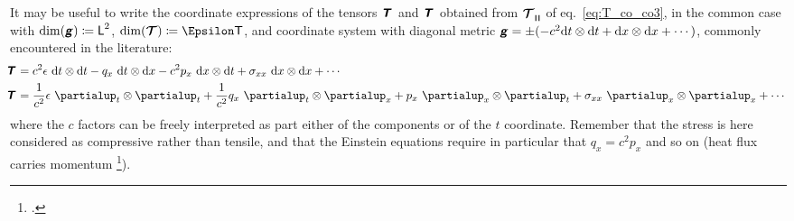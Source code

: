 \documentclass[\ifafour a4paper,12pt,\else a5paper,10pt,\fi%
onecolumn,oneside,article,%
british%
]{memoir}
\makeatletter
\theoremstyle{remark}
\theoremstyle{innote}
\newcommand*{\mathte}[1]{\textbf{\textit{\textsf{#1}}}}
\newcommand*{\citep}{\footcites}
\newcommand*{\de}{\partialup}%
\newcommand*{\di}{\mathrm{d}}%
\newcommand*{\defd}{\coloneqq}
\renewcommand*{\|}[1][]{\nonscript\,#1\vert\nonscript\;\mathopen{}}
\newcommand*{\sect}{\S}%
\newcommand*{\eqn}{eq.}%
\newcommand*{\q}{}%
\DeclareRobustCommand*{\q}{%
  \mathord{\mathpalette\bigcdot@{}}%
}
\newcommand*{\bigcdot@scalefactor}{0.7}
\newcommand*{\bigcdot@widthfactor}{1.5}
\newcommand*{\bigcdot@}[2]{%
  \sbox0{$#1\vcenter{}$}%
  \sbox2{$#1\cdot\m@th$}%
  \hbox to \bigcdot@widthfactor\wd2{%
    \hfil
    \raise\ht0\hbox{%
      \scalebox{\bigcdot@scalefactor}{%
        \lower\ht0\hbox{$#1\bullet\m@th$}%
      }%
    }%
    \hfil
  }%
}
\newcommand*{\Le}{\textsf{L}}
\newcommand*{\Ti}{\textsf{T}}
\newcommand*{\En}{\Epsilon}%
\newcommand*{\yg}{\mathte{g}}
\newcommand*{\yT}{\bm{\mathcal{T}}}
\newcommand*{\yTe}{\mathte{T}}
\renewcommand*{\i}{\indices}
\newcommand*{\en}{\epsilon}
\newcommand*{\yq}{q}
\newcommand*{\yp}{p}
\newcommand*{\yt}{\sigma}
\newcommand*{\rul}{{\mkern2mu\rule[-0.1ex]{0.75pt}{1.1ex}\mkern2mu}}
\DeclarePairedDelimiter\mul{\rul}{\rul}%
\makeatother
\begin{document}
It may be useful to write the coordinate expressions of the tensors
$\yTe\i{_{\q\q}}$ and $\yTe\i{^{\q\q}}$ obtained from
$\yT\i{_{\q\mul{\q\q\q}}}$ of \eqn~\eqref{eq:T_co_co3}, in the common case
with $\dim(\yg)\defd \Le^2$, $\dim(\yT)\defd \En\Ti$, and coordinate system
with diagonal metric
$\yg = \pm(-c^{2} \di t \otimes \di t + \di x \otimes \di x + \dotsb)$,
commonly encountered in the literature:
\begin{align}
      \mbox{}\hspace{-1ex}\yTe\i{_{\q\q}} &=
      c^{2}\en\  \di t\otimes\di t 
      -\yq_{x}\  \di t\otimes\di x
      -c^{2}\yp_{x}\  \di x\otimes\di t 
                        +\yt_{x x}\  \di x\otimes\di x + \dotsb
  \label{eq:common_T_coco}
  \\
      \mbox{}\hspace{-1ex}\yTe\i{^{\q\q}} &=
      \frac{1}{c^{2}}\en\  \de_{t}\otimes\de_{t} 
      +\frac{1}{c^{2}}\yq_{x}\  \de_{t}\otimes\de_{x} 
      +\yp_{x}\  \de_{x}\otimes\de_{t} 
      +\yt_{x x}\  \de_{x}\otimes\de_{x} + \dotsb
    \label{eq:common_T_covcov}
\end{align}
where the $c$ factors can be freely interpreted as part either of the
components or of the $t$ coordinate. Remember that the stress is here
considered as compressive rather than tensile, and that the Einstein
equations require in particular that $\yq_{x} = c^{2} \yp_{x}$ and so on
(heat flux carries momentum \citep[p.~923]{eckart1940c}).
 

 


\end{document}
